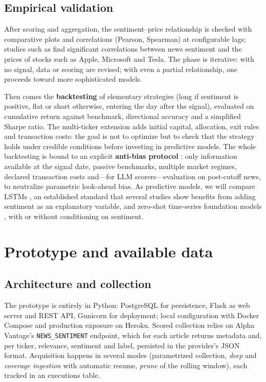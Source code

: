 \documentclass[a4paper,11pt]{article}
\begin{document}
\subsection{Empirical validation}

After scoring and aggregation, the sentiment--price relationship is checked with comparative plots and correlations (Pearson, Spearman) at configurable lags; studies such as \textcite{cristescu2023wavelet} find significant correlations between news sentiment and the prices of stocks such as Apple, Microsoft and Tesla. The phase is iterative: with no signal, data or scoring are revised; with even a partial relationship, one proceeds toward more sophisticated models.

Then comes the \textbf{backtesting} of elementary strategies (long if sentiment is positive, flat or short otherwise, entering the day after the signal), evaluated on cumulative return against benchmark, directional accuracy and a simplified Sharpe ratio. The multi-ticker extension adds initial capital, allocation, exit rules and transaction costs: the goal is not to optimize but to check that the strategy holds under credible conditions before investing in predictive models. The whole backtesting is bound to an explicit \textbf{anti-bias protocol} \parencite{li2025finsaber}: only information available at the signal date, passive benchmarks, multiple market regimes, declared transaction costs and---for LLM scorers---evaluation on post-cutoff news, to neutralize parametric look-ahead bias. As predictive models, we will compare LSTMs \parencite{fischer2018deep, ouf2024lstm}, an established standard that several studies show benefits from adding sentiment as an explanatory variable, and zero-shot time-series foundation models \parencite{ansari2024chronos, das2024timesfm}, with or without conditioning on sentiment.

\section{Prototype and available data}
\label{sec:prototipo}

\subsection{Architecture and collection}

The prototype is entirely in Python: PostgreSQL for persistence, Flask as web server and REST API, Gunicorn for deployment; local configuration with Docker Compose and production exposure on Heroku. Scored collection relies on Alpha Vantage's \texttt{NEWS\_SENTIMENT} endpoint, which for each article returns metadata and, per ticker, relevance, sentiment and label, persisted in the provider's JSON format. Acquisition happens in several modes (parametrized collection, \emph{deep} and \emph{coverage ingestion} with automatic resume, \emph{prune} of the rolling window), each tracked in an executions table.
\end{document}
